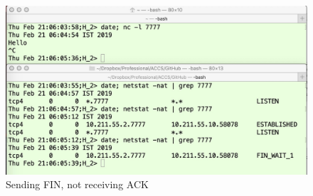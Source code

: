 \begin{figure}[!htb]
\centering
\includegraphics[scale=.228]{src/Figures/chap3/9.jpg}
\caption{Sending FIN, not receiving ACK}\label{chap3-fig9}
\end{figure}

